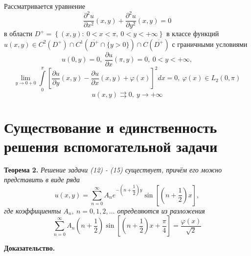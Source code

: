 \documentclass[12pt, a4paper]{article}
\begin{document}
Рассматривается уравнение
\begin{equation}
	\dfrac{\partial^2 u}{\partial x^2}(x,y) + \dfrac{\partial^2 u}{\partial y^2}(x,y) = 0
\end{equation}
в области $D^{+} = \left\{(x,y): \ 0 < x < \pi, \ 0 < y < + \infty \right\}$ в классе функций $u(x,y) \in  C^2(D^+) \cap C^1(\overline{D^+} \cap \{y > 0\}) \cap C(\overline{D^+})$ 
с граничными условиями 
\begin{equation}
	u(0,y) = 0, \ \dfrac{\partial u}{\partial x}(\pi, y) = 0, \ 0 < y < +\infty, 
\end{equation}
\begin{equation}
	\lim\limits_{y \to 0+0} \int\limits_0^\pi \left[\dfrac{\partial u}{\partial y}(x, y) - \dfrac{\partial u}{\partial x}(x,y) + \varphi(x) \right]^2   dx = 0, \ \varphi(x) \in L_2(0, \pi)
\end{equation}
\begin{equation}
	u(x,y) \rightrightarrows 0, \ y \to +\infty 
\end{equation}

\section{Существование и единственность решения вспомогательной задачи}

\textbf{Теорема 2.} \textit{	Решение задачи (12) - (15) существует, причём его можно представить в виде ряда
	\begin{equation}
		u(x,y) = \sum\limits_{n=0}^{\infty} A_n e^{-\left(n + \dfrac12\right)y} \sin{\left[\left(n + \dfrac12\right)x\right]},
	\end{equation}
	где коэффициенты $A_n, \ n =0,1,2, \dots$ определяются из разложения
	\begin{equation}
		\sum\limits_{n=0}^{\infty} A_n \left(n + \dfrac12 \right) \sin{\left[\left(n +\dfrac12\right)x + \dfrac\pi4\right]} = \dfrac{\varphi(x)}{\sqrt2}
\end{equation}}

\textbf{Доказательство.} 
\end{document}
